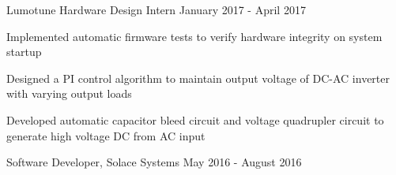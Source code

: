 \begin{cventries}

  \cventry
    {Lumotune} %
    {Hardware Design Intern} %
    {January 2017 - April 2017} %
    {}
    {
      \begin{cvitems} %
        \item {Implemented automatic firmware tests to verify hardware integrity on system startup}
        \item {Designed a PI control algorithm to maintain output voltage of DC-AC inverter with varying output loads}
        \item {Developed automatic capacitor bleed circuit and voltage quadrupler circuit to generate high voltage DC from AC input}
      \end{cvitems}
    }

  \cventryOneLine
    {Software Developer,} %
    {Solace Systems} %
    {May 2016 - August 2016} %


\end{cventries}

